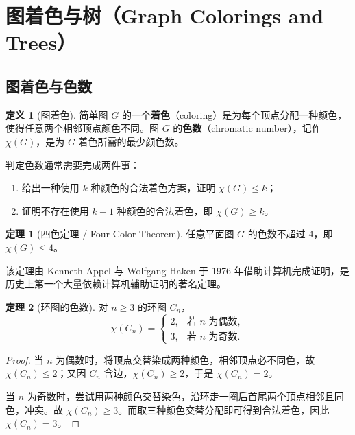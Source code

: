 \documentclass[UTF8,11pt,a4paper]{ctexbook}   %
\theoremstyle{definition}
\newtheorem{definition}{定义}[section]
\newtheorem{theorem}{定理}[section]
\begin{document}
\section{图着色与树（Graph Colorings and Trees）}

\subsection{图着色与色数}

\begin{definition}[图着色]
简单图 $G$ 的一个\textbf{着色}（coloring）是为每个顶点分配一种颜色，使得任意两个相邻顶点颜色不同。图 $G$ 的\textbf{色数}（chromatic number），记作 $\chi(G)$，是为 $G$ 着色所需的最少颜色数。
\end{definition}

判定色数通常需要完成两件事：
\begin{enumerate}
    \item 给出一种使用 $k$ 种颜色的合法着色方案，证明 $\chi(G)\le k$；
    \item 证明不存在使用 $k-1$ 种颜色的合法着色，即 $\chi(G)\ge k$。
\end{enumerate}

\begin{theorem}[四色定理 / Four Color Theorem]
任意平面图 $G$ 的色数不超过 4，即 $\chi(G)\le 4$。
\end{theorem}

该定理由 Kenneth Appel 与 Wolfgang Haken 于 1976 年借助计算机完成证明，是历史上第一个大量依赖计算机辅助证明的著名定理。

\begin{theorem}[环图的色数]
对 $n\ge 3$ 的环图 $C_n$，
\[
\chi(C_n)=
\begin{cases}
2, & \text{若 } n \text{ 为偶数},\\[0.3em]
3, & \text{若 } n \text{ 为奇数}.
\end{cases}
\]
\end{theorem}

\begin{proof}
当 $n$ 为偶数时，将顶点交替染成两种颜色，相邻顶点必不同色，故 $\chi(C_n)\le 2$；又因 $C_n$ 含边，$\chi(C_n)\ge 2$，于是 $\chi(C_n)=2$。

当 $n$ 为奇数时，尝试用两种颜色交替染色，沿环走一圈后首尾两个顶点相邻且同色，冲突。故 $\chi(C_n)\ge 3$。而取三种颜色交替分配即可得到合法着色，因此 $\chi(C_n)=3$。
\end{proof}
\end{document}
